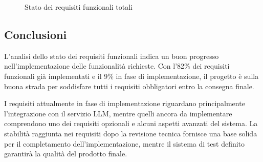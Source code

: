 \documentclass[10pt]{article}
\begin{document}
\begin{figure}[H]
    \centering
    \caption{Stato dei requisiti funzionali totali}
    \label{fig:stato_requisiti_totali}
\end{figure}

\subsection{Conclusioni}

L'analisi dello stato dei requisiti funzionali indica un buon progresso nell'implementazione delle funzionalità richieste. Con l'82\% dei requisiti funzionali già implementati e il 9\% in fase di implementazione, il progetto è sulla buona strada per soddisfare tutti i requisiti obbligatori entro la consegna finale.

I requisiti attualmente in fase di implementazione riguardano principalmente l'integrazione con il servizio LLM, mentre quelli ancora da implementare comprendono uno dei requisiti opzionali e alcuni aspetti avanzati del sistema. La stabilità raggiunta nei requisiti dopo la revisione tecnica fornisce una base solida per il completamento dell'implementazione, mentre il sistema di test definito garantirà la qualità del prodotto finale.
\end{document}
